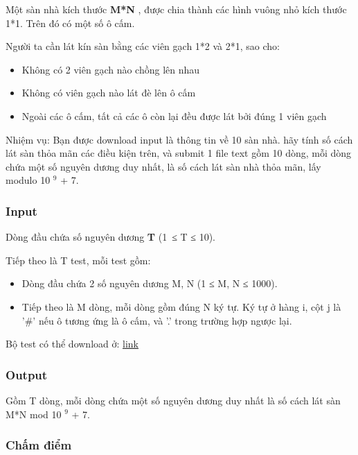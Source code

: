 



   Một sàn nhà kích thước   \textbf{    M*N   }   , được chia thành các hình vuông nhỏ kích thước 1*1. Trên đó có một số ô cấm.  

   Người ta cần lát kín sàn bằng các viên gạch 1*2 và 2*1, sao cho:  
\begin{itemize}
	\item     Không có 2 viên gạch nào chồng lên nhau   
	\item     Không có viên gạch nào lát đè lên ô cấm   
	\item     Ngoài các ô cấm, tất cả các ô còn lại đều được lát bởi đúng 1 viên gạch   
\end{itemize}

   Nhiệm vụ: Bạn được download input là thông tin về 10 sàn nhà. hãy tính số cách lát sàn thỏa mãn các điều kiện trên, và submit 1 file text gồm 10 dòng, mỗi dòng chứa một số nguyên dương duy nhất, là số cách lát sàn nhà thỏa mãn, lấy modulo 10   $^    9   $   + 7.  

\subsubsection{   Input  }

   Dòng đầu chứa số nguyên dương   \textbf{    T   }   (1 ≤ T ≤ 10).  

   Tiếp theo là T test, mỗi test gồm:  
\begin{itemize}
	\item     Dòng đầu chứa 2 số nguyên dương M, N (1 ≤ M, N ≤ 1000).   
	\item     Tiếp theo là M dòng, mỗi dòng gồm đúng N ký tự. Ký tự ở hàng i, cột j là '\#' nếu ô tương ứng là ô cấm, và '.' trong trường hợp ngược lại.   
\end{itemize}

   Bộ test có thể download ở:   \href{../../../content/voj:VMTILE}{    link   }

\subsubsection{   Output  }

   Gồm T dòng, mỗi dòng chứa một số nguyên dương duy nhất là số cách lát sàn M*N mod 10   $^    9   $   + 7.  

\subsubsection{   Chấm điểm  }

